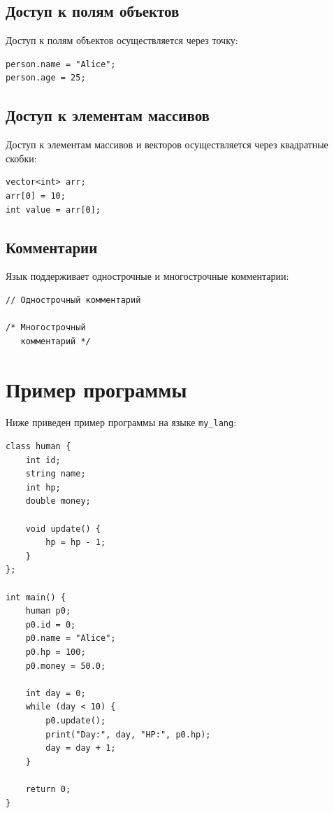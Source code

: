 \documentclass[12pt,a4paper]{article}
\begin{document}
\subsection{Доступ к полям объектов}

Доступ к полям объектов осуществляется через точку:

\begin{lstlisting}
person.name = "Alice";
person.age = 25;
\end{lstlisting}

\subsection{Доступ к элементам массивов}

Доступ к элементам массивов и векторов осуществляется через квадратные скобки:

\begin{lstlisting}
vector<int> arr;
arr[0] = 10;
int value = arr[0];
\end{lstlisting}

\subsection{Комментарии}

Язык поддерживает однострочные и многострочные комментарии:

\begin{lstlisting}
// Однострочный комментарий

/* Многострочный
   комментарий */
\end{lstlisting}

\section{Пример программы}

Ниже приведен пример программы на языке \texttt{my\_lang}:

\begin{lstlisting}
class human {
    int id;
    string name;
    int hp;
    double money;
    
    void update() {
        hp = hp - 1;
    }
};

int main() {
    human p0;
    p0.id = 0;
    p0.name = "Alice";
    p0.hp = 100;
    p0.money = 50.0;
    
    int day = 0;
    while (day < 10) {
        p0.update();
        print("Day:", day, "HP:", p0.hp);
        day = day + 1;
    }
    
    return 0;
}
\end{lstlisting}
\end{document}
